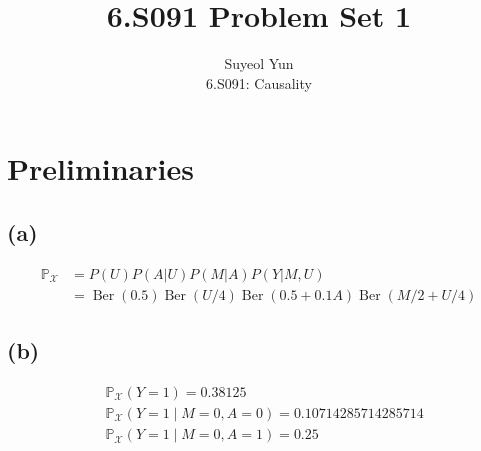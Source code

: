 \documentclass[10pt]{article}
\begin{document}
 
\title{6.S091 Problem Set 1}
\author{Suyeol Yun\\
6.S091: Causality}
\maketitle
 
\section{Preliminaries}
\subsection{(a)} 
\begin{align*}
\mathbb{P}_{\mathcal{X}} &= P(U)P(A|U)P(M|A)P(Y|M, U) \\
&= \operatorname{Ber}(0.5) \operatorname{Ber}(U/4) \operatorname{Ber}(0.5 + 0.1A)\operatorname{Ber}(M/2 + U/4)
\end{align*}

\subsection{(b)} 
\begin{align*}
&\mathbb{P}_{\mathcal{X}}(Y=1) = 0.38125\\
&\mathbb{P}_{\mathcal{X}}(Y=1 \mid M=0, A=0)= 0.10714285714285714\\
&\mathbb{P}_{\mathcal{X}}(Y=1 \mid M=0, A=1)= 0.25\\
\end{align*}




\end{document}
